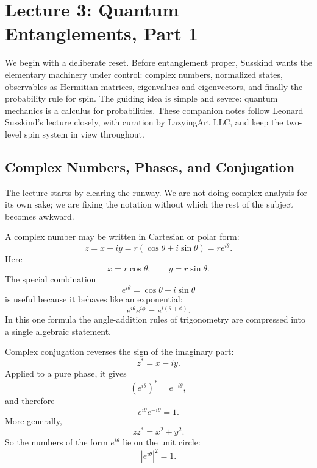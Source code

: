 \chapter{Lecture 3: Quantum Entanglements, Part 1}

We begin with a deliberate reset. Before entanglement proper, Susskind wants the elementary machinery under control: complex numbers, normalized states, observables as Hermitian matrices, eigenvalues and eigenvectors, and finally the probability rule for spin. The guiding idea is simple and severe: quantum mechanics is a calculus for probabilities. These companion notes follow Leonard Susskind's lecture closely, with curation by LazyingArt LLC, and keep the two-level spin system in view throughout.

\section{Complex Numbers, Phases, and Conjugation}

The lecture starts by clearing the runway. We are not doing complex analysis for its own sake; we are fixing the notation without which the rest of the subject becomes awkward.

A complex number may be written in Cartesian or polar form:
\begin{equation}
z=x+iy=r(\cos\theta+i\sin\theta)=re^{i\theta}.
\end{equation}
Here
\begin{equation}
x=r\cos\theta,\qquad y=r\sin\theta.
\end{equation}
The special combination
\begin{equation}
e^{i\theta}=\cos\theta+i\sin\theta
\end{equation}
is useful because it behaves like an exponential:
\begin{equation}
e^{i\theta}e^{i\phi}=e^{i(\theta+\phi)}.
\end{equation}
In this one formula the angle-addition rules of trigonometry are compressed into a single algebraic statement.

Complex conjugation reverses the sign of the imaginary part:
\begin{equation}
z^*=x-iy.
\end{equation}
Applied to a pure phase, it gives
\begin{equation}
(e^{i\theta})^*=e^{-i\theta},
\end{equation}
and therefore
\begin{equation}
e^{i\theta}e^{-i\theta}=1.
\end{equation}
More generally,
\begin{equation}
zz^*=x^2+y^2.
\end{equation}
So the numbers of the form \(e^{i\theta}\) lie on the unit circle:
\begin{equation}
|e^{i\theta}|^2=1.
\end{equation}

